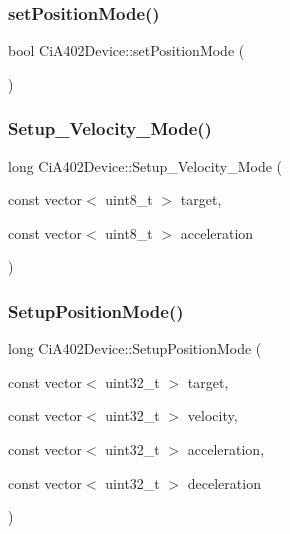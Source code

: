 \subsubsection{\texorpdfstring{set\+Position\+Mode()}{setPositionMode()}}
{\footnotesize\ttfamily bool Ci\+A402\+Device\+::set\+Position\+Mode (\begin{DoxyParamCaption}{ }\end{DoxyParamCaption})}

\mbox{\label{classCiA402Device_a42e8505120ada57ea8292902ce9f9c5e}} 
\subsubsection{\texorpdfstring{Setup\+\_\+\+Velocity\+\_\+\+Mode()}{Setup\_Velocity\_Mode()}}
{\footnotesize\ttfamily long Ci\+A402\+Device\+::\+Setup\+\_\+\+Velocity\+\_\+\+Mode (\begin{DoxyParamCaption}\item[{const vector$<$ uint8\+\_\+t $>$}]{target,  }\item[{const vector$<$ uint8\+\_\+t $>$}]{acceleration }\end{DoxyParamCaption})}

\mbox{\label{classCiA402Device_abca4743b617d109a915215193bd06fbe}} 
\subsubsection{\texorpdfstring{Setup\+Position\+Mode()}{SetupPositionMode()}\hspace{0.1cm}{\footnotesize\ttfamily [1/2]}}
{\footnotesize\ttfamily long Ci\+A402\+Device\+::\+Setup\+Position\+Mode (\begin{DoxyParamCaption}\item[{const vector$<$ uint32\+\_\+t $>$}]{target,  }\item[{const vector$<$ uint32\+\_\+t $>$}]{velocity,  }\item[{const vector$<$ uint32\+\_\+t $>$}]{acceleration,  }\item[{const vector$<$ uint32\+\_\+t $>$}]{deceleration }\end{DoxyParamCaption})}


